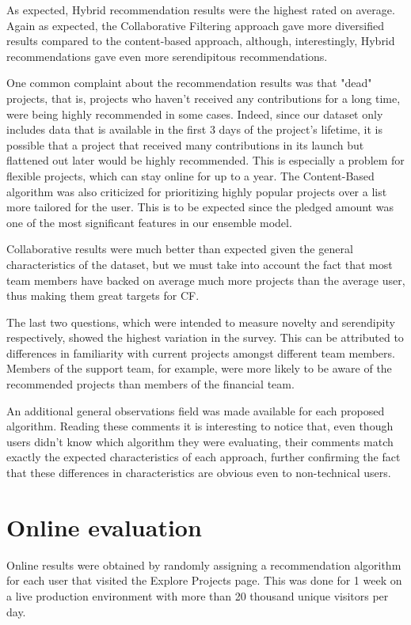 \documentclass[cic,tc,english]{iiufrgs}
\begin{document}
As expected, Hybrid recommendation results were the highest rated on average. Again as expected, the Collaborative Filtering approach gave more diversified results compared to the content-based approach, although, interestingly, Hybrid recommendations gave even more serendipitous recommendations. 

One common complaint about the recommendation results was that "dead" projects, that is, projects who haven't received any contributions for a long time, were being highly recommended in some cases. Indeed, since our dataset only includes data that is available in the first 3 days of the project's lifetime, it is possible that a project that received many contributions in its launch but flattened out later would be highly recommended. This is especially a problem for flexible projects, which can stay online for up to a year. The Content-Based algorithm was also criticized for prioritizing highly popular projects over a list more tailored for the user. This is to be expected since the pledged amount was one of the most significant features in our ensemble model.

Collaborative results were much better than expected given the general characteristics of the dataset, but we must take into account the fact that most team members have backed on average much more projects than the average user, thus making them great targets for CF. 

The last two questions, which were intended to measure novelty and serendipity respectively, showed the highest variation in the survey. This can be attributed to differences in familiarity with current projects amongst different team members. Members of the support team, for example, were more likely to be aware of the recommended projects than members of the financial team.

An additional general observations field was made available for each proposed algorithm. Reading these comments it is interesting to notice that, even though users didn't know which algorithm they were evaluating, their comments match exactly the expected characteristics of each approach, further confirming the fact that these differences in characteristics are obvious even to non-technical users.

\section{Online evaluation}
Online results were obtained by randomly assigning a recommendation algorithm for each user that visited the Explore Projects page. This was done for 1 week on a live production environment with more than 20 thousand unique visitors per day.
\end{document}
